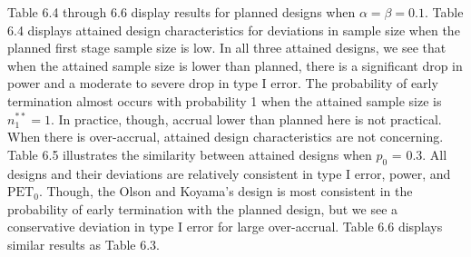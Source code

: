 \documentclass[12pt]{report}\usepackage[]{graphicx}\usepackage[]{color}
\newlength{\li}\setlength{\li}{14.48pt}
\newlength{\di}\setlength{\di}{-3.5mm}
\begin{document}
\indent Table 6.4 through 6.6 display results for planned designs when $\alpha = \beta = 0.1$. Table 6.4 displays attained design characteristics for deviations in sample size when the planned first stage sample size is low. In all three attained designs, we see that when the attained sample size is lower than planned, there is a significant drop in power and a moderate to severe drop in type I error. The probability of early termination almost occurs with probability 1 when the attained sample size is $n_1^{\ast\ast} = 1$. In practice, though, accrual lower than planned here is not practical. When there is over-accrual, attained design characteristics are not concerning. \\
\indent Table 6.5 illustrates the similarity between attained designs when $p_0$ = 0.3. All designs and their deviations are relatively consistent in type I error, power, and $\mbox{PET}_0$. Though, the Olson and Koyama's design is most consistent in the probability of early termination with the planned design, but we see a conservative deviation in type I error for large over-accrual. Table 6.6 displays similar results as Table 6.3. \\
\end{document}
